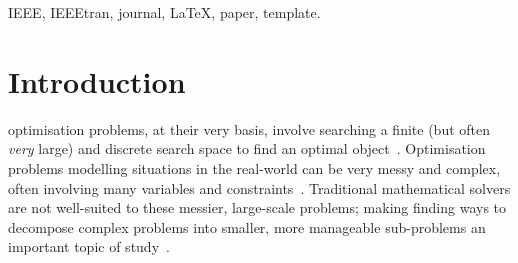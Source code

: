 \documentclass[journal]{IEEEtran}
\begin{document}
\begin{IEEEkeywords}
IEEE, IEEEtran, journal, \LaTeX, paper, template.
\end{IEEEkeywords}






%
\IEEEpeerreviewmaketitle

\section{Introduction}\label{sec:intro}
 optimisation problems, at their very basis, involve searching a finite (but often \emph{very} large) and discrete search space to find an optimal object~\cite{copalg}. 
Optimisation problems modelling situations in the real-world can be very messy and complex, often involving many variables and constraints~\cite{deb_book}. Traditional mathematical solvers are not well-suited to these messier, large-scale problems; making finding ways to decompose complex problems into smaller, more manageable sub-problems an important topic of study~\cite{hybridmeta}.
\end{document}
